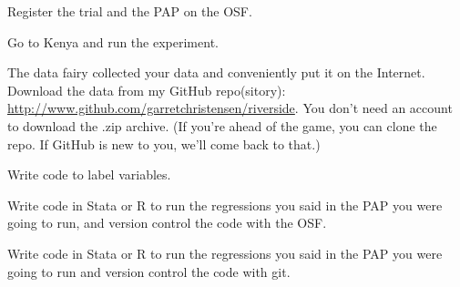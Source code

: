\documentclass[addpoints,10pt]{exam}
\begin{document}
\begin{questions}



\question
Register the trial and the PAP on the OSF. 

\question 
Go to Kenya and run the experiment.
 
\question
The data fairy collected your data and conveniently put it on the Internet. Download the data from my GitHub repo(sitory): \url{http://www.github.com/garretchristensen/riverside}. You don't need an account to download the .zip archive. (If you're ahead of the game, you can clone the repo. If GitHub is new to you, we'll come back to that.)

\question 
Write code to label variables.

\question
Write code in Stata or R to run the regressions you said in the PAP you were going to run, and version control the code with the OSF.

\question
Write code in Stata or R to run the regressions you said in the PAP you were going to run and version control the code with git.
\end{questions}
\end{document}
